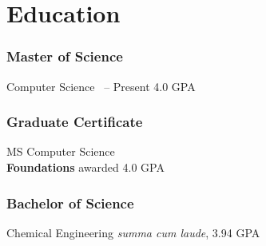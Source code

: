 %
%
%
%
\section{Education}
  \subsubsection{Master of Science} 
  \school%
    {Computer Science}%
    {\SchoolA}%
    {\SchoolAdate \ -- Present}%
    {4.0 GPA}
%
%
  {\vspace{-1em}}
%
%
  \subsubsection{Graduate Certificate}
  \school%
    {MS Computer Science \\ \bf{Foundations}}%
    {\SchoolB}%
    {awarded \SchoolBdate}%
    {4.0 GPA}
%
%
  {\vspace{-1em}}
%
%
  \subsubsection{Bachelor of Science}
  \school%
    {Chemical Engineering}%
    {\SchoolC}%
    {\textit{summa cum laude}, \SchoolCdate}%
    {3.94 GPA}
%
%
%